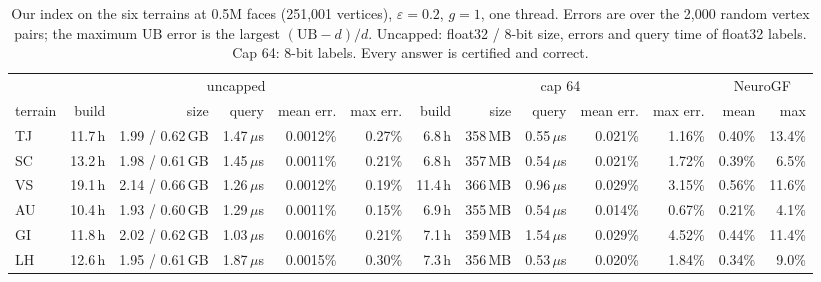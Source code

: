 \documentclass[sigconf,nonacm,screen]{acmart}
\newcommand{\UB}{\mathrm{UB}}
\newcommand{\eps}{\varepsilon}
\begin{document}
\begin{table}[t]
\caption{Our index on the six terrains at 0.5M faces (251,001 vertices), $\eps=0.2$, $g=1$, one thread. Errors are
over the 2,000 random vertex pairs; the maximum $\UB$ error is the largest $(\UB-d)/d$. Uncapped: float32 / 8-bit
size, errors and query time of float32 labels. Cap 64: 8-bit labels. Every answer is certified and correct.}
\label{tab:server-ours}
\small
\begin{tabular}{@{}l|rrrrr|rrrrr|rr@{}}
\toprule
 & \multicolumn{5}{c|}{uncapped} & \multicolumn{5}{c|}{cap 64} & \multicolumn{2}{c}{NeuroGF}\\
terrain & build & size & query & mean err. & max err. & build & size & query & mean err. & max err. & mean & max\\
\midrule
TJ & 11.7\,h & 1.99 / 0.62\,GB & 1.47\,$\mu$s & 0.0012\% & 0.27\% & 6.8\,h & 358\,MB & 0.55\,$\mu$s & 0.021\% & 1.16\% & 0.40\% & 13.4\%\\
SC & 13.2\,h & 1.98 / 0.61\,GB & 1.45\,$\mu$s & 0.0011\% & 0.21\% & 6.8\,h & 357\,MB & 0.54\,$\mu$s & 0.021\% & 1.72\% & 0.39\% & 6.5\%\\
VS & 19.1\,h & 2.14 / 0.66\,GB & 1.26\,$\mu$s & 0.0012\% & 0.19\% & 11.4\,h & 366\,MB & 0.96\,$\mu$s & 0.029\% & 3.15\% & 0.56\% & 11.6\%\\
AU & 10.4\,h & 1.93 / 0.60\,GB & 1.29\,$\mu$s & 0.0011\% & 0.15\% & 6.9\,h & 355\,MB & 0.54\,$\mu$s & 0.014\% & 0.67\% & 0.21\% & 4.1\%\\
GI & 11.8\,h & 2.02 / 0.62\,GB & 1.03\,$\mu$s & 0.0016\% & 0.21\% & 7.1\,h & 359\,MB & 1.54\,$\mu$s & 0.029\% & 4.52\% & 0.44\% & 11.4\%\\
LH & 12.6\,h & 1.95 / 0.61\,GB & 1.87\,$\mu$s & 0.0015\% & 0.30\% & 7.3\,h & 356\,MB & 0.53\,$\mu$s & 0.020\% & 1.84\% & 0.34\% & 9.0\%\\
\bottomrule
\end{tabular}
\end{table}
\end{document}
